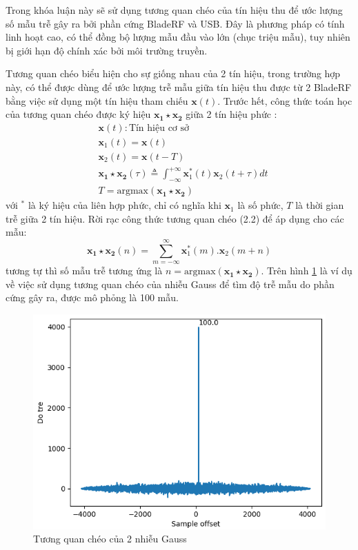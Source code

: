 Trong khóa luận này sẽ sử dụng tương quan chéo của tín hiệu thu để ước lượng số mẫu trễ gây ra bởi phần cứng BladeRF và USB. Đây là phương pháp có tính linh hoạt cao, có thể đồng bộ lượng mẫu đầu vào lớn (chục triệu mẫu), tuy nhiên bị giới hạn độ chính xác bởi môi trường truyền.

Tương quan chéo biểu hiện cho sự giống nhau của 2 tín hiệu, trong trường hợp này, có thể được dùng để ước lượng trễ mẫu giữa tín hiệu thu được từ 2 BladeRF bằng việc sử dụng một tín hiệu tham chiếu $\mathbf{x}(t)$. Trước hết, công thức toán học của tương quan chéo được ký hiệu $\mathbf{x_1 \star x_2}$ giữa 2 tín hiệu phức \cite{Bracewell1978}:
\begin{equation}
\begin{split}
&\mathbf{x}(t): \textrm{Tín hiệu cơ sở}\\
&\mathbf{x}_1(t) =\mathbf{x}(t)\\
&\mathbf{x}_2(t) =\mathbf{x}(t - T) \\
&\mathbf{x_1 \star x_2}(\tau) \triangleq \int_{-\infty}^{+\infty} \mathbf{x}_{1}^{*} (t) \mathbf{x}_{2} (t + \tau) dt \\
&T =\textrm{argmax}(\mathbf{x_1 \star x_2})
\end{split}
\end{equation}
với $^*$ là ký hiệu của liên hợp phức, chỉ có nghĩa khi $\mathbf{x}_1$ là số phức, $T$  là thời gian trễ giữa 2 tín hiệu. Rời rạc công thức tương quan chéo (2.2) để áp dụng cho các mẫu:
\begin{equation}
\mathbf{x_1 \star x_2}(n) = \sum_{m = -\infty}^{\infty} \mathbf{x}^*_1 (m) .\mathbf{x}_2 (m + n)
\end{equation}
tương tự thì số mẫu trễ tương ứng là $n = \mathrm{argmax(\mathbf{x_1 \star x_2})}$. Trên hình \ref{fig:xcorr} là ví dụ về việc sử dụng tương quan chéo của nhiễu Gauss để tìm độ trễ mẫu do phần cứng gây ra, được mô phỏng là 100 mẫu. 
\begin{figure} [!h]
	\centering
	\includegraphics[width=0.8\linewidth]{figures/xcorr.png}
	\caption{Tương quan chéo của 2 nhiễu Gauss}
	\label{fig:xcorr}
\end{figure}

